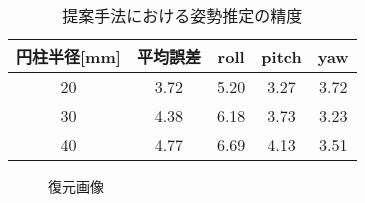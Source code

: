 \documentclass{jsarticle}
\begin{document}



\begin{table}[h]
        \vspace{0zh}
          \begin{center}
            \caption{提案手法における姿勢推定の精度}
            \label{hyouka}
            \begin{tabular}{c|c|c|c|c} \hline
              円柱半径[mm]   &平均誤差& roll& pitch & yaw \\ \hline
              20&3.72& 5.20 & 3.27 & 3.72 \\ \hline
              30& 4.38&6.18 & 3.73 & 3.23 \\ \hline
              40&4.77&6.69 &4.13  &3.51 \\ \hline
              \end{tabular}
          \end{center}
        \vspace{-1.0zh}
\end{table}

\begin{figure}[ht]
\vspace{-2zh}
\setlength{\epsfxsize}{6.5cm}
\centerline{}
\vspace{-1zh}
\caption{復元画像}
\label{F}
\vspace{-2zh}
\end{figure}


\end{document}
